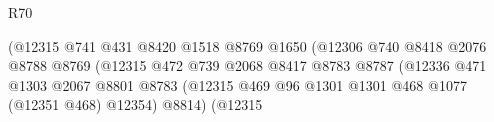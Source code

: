 \begin{lexlean}{R70}
\begin{coremodule}
                                                          (@12315
                                                            @741
                                                            @431
                                                            @8420
                                                            @1518
                                                            @8769
                                                            @1650
                                                            (@12306
                                                              @740
                                                              @8418
                                                              @2076
                                                              @8788
                                                              @8769
                                                              (@12315
                                                                @472
                                                                @739
                                                                @2068
                                                                @8417
                                                                @8783
                                                                @8787
                                                                (@12336
                                                                  @471
                                                                  @1303
                                                                  @2067
                                                                  @8801
                                                                  @8783
                                                                  (@12315
                                                                    @469
                                                                    @96
                                                                    @1301
                                                                    @1301
                                                                    @468
                                                                    @1077
                                                                    (@12351 @468)
                                                                    @12354)
                                                                  @8814)
                                                                (@12315

\end{coremodule}
\end{lexlean}
